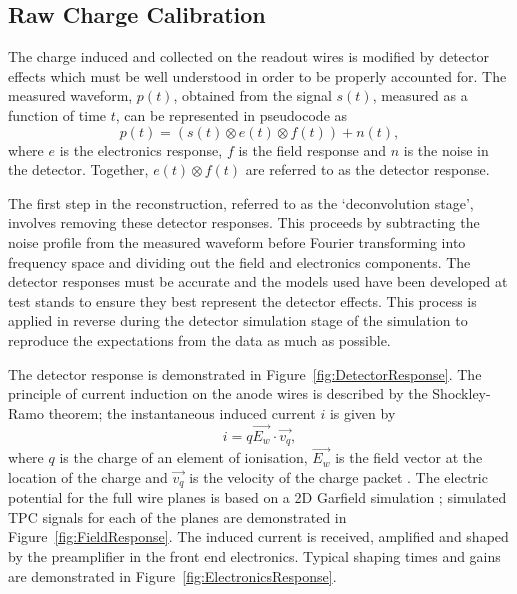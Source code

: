 \subsection{Raw Charge Calibration}\label{sec:HitReconstruction}

The charge induced and collected on the readout wires is modified by detector effects which must be well understood in order to be properly accounted for.  The measured waveform, $p(t)$, obtained from the signal $s(t)$, measured as a function of time $t$, can be represented in pseudocode as
\begin{equation}
  p(t) = \left( s(t) \otimes e(t) \otimes f(t) \right) + n(t),
\end{equation}
where $e$ is the electronics response, $f$ is the field response and $n$ is the noise in the detector.  Together, $e(t) \otimes f(t)$ are referred to as the detector response.

The first step in the reconstruction, referred to as the `deconvolution stage', involves removing these detector responses.  This proceeds by subtracting the noise profile from the measured waveform before Fourier transforming into frequency space and dividing out the field and electronics components.  The detector responses must be accurate and the models used have been developed at test stands to ensure they best represent the detector effects.  This process is applied in reverse during the detector simulation stage of the simulation to reproduce the expectations from the data as much as possible.

The detector response is demonstrated in Figure~\ref{fig:DetectorResponse}.  The principle of current induction on the anode wires is described by the Shockley-Ramo \cite{Shockley1938,Ramo1939} theorem; the instantaneous induced current $i$ is given by
\begin{equation}
  i = q \vec{E_w} \cdot \vec{v_q},
\end{equation}
where $q$ is the charge of an element of ionisation, $\vec{E_w}$ is the field vector at the location of the charge and $\vec{v_q}$ is the velocity of the charge packet \cite{MicroBooNERawCharge2016}.  The electric potential for the full wire planes is based on a 2D Garfield simulation \cite{GarfieldWebsite}; simulated TPC signals for each of the planes are demonstrated in Figure~\ref{fig:FieldResponse}.  The induced current is received, amplified and shaped by the preamplifier in the front end electronics.  Typical shaping times and gains are demonstrated in Figure~\ref{fig:ElectronicsResponse}.

